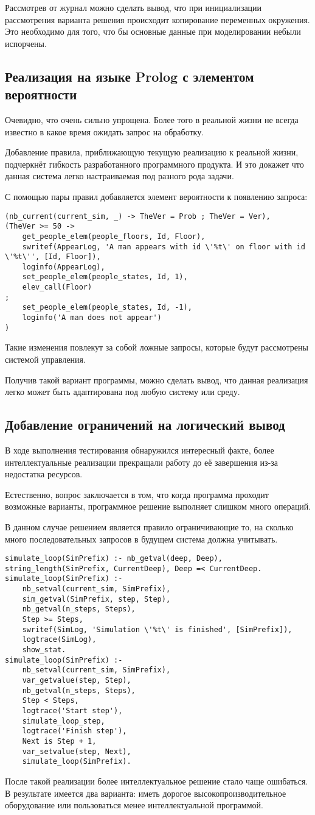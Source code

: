 		Рассмотрев от журнал можно сделать вывод, что при инициализации рассмотрения варианта решения
			происходит копирование переменных окружения. Это необходимо для того, что бы 
			основные данные при моделировании небыли испорчены.

	\subsection{Реализация на языке Prolog с элементом вероятности}
		Очевидно, что очень сильно упрощена. Более того в реальной жизни не всегда известно
			в какое время ожидать запрос на обработку.

		Добавление правила, приближающую текущую реализацию к реальной жизни, подчеркнёт
			гибкость разработанного программного продукта. И это докажет что данная система легко настраиваемая
			под разного рода задачи.

		С помощью пары правил добавляется элемент вероятности к появлению запроса:
\begin{lstlisting}
(nb_current(current_sim, _) -> TheVer = Prob ; TheVer = Ver),
(TheVer >= 50 ->
	get_people_elem(people_floors, Id, Floor),
	swritef(AppearLog, 'A man appears with id \'%t\' on floor with id \'%t\'', [Id, Floor]),
	loginfo(AppearLog),
	set_people_elem(people_states, Id, 1),
	elev_call(Floor)
;
	set_people_elem(people_states, Id, -1),
	loginfo('A man does not appear')
)
\end{lstlisting}

		Такие изменения повлекут за собой ложные запросы, которые будут рассмотрены системой управления.

		Получив такой вариант программы, можно сделать вывод, что данная реализация легко  может быть адаптирована
			под любую систему или среду.

	\subsection{Добавление ограничений на логический вывод}
		В ходе выполнения тестирования обнаружился интересный факте, более интеллектуальные реализации
			прекращали работу до её завершения из-за недостатка ресурсов. 

		Естественно, вопрос заключается в том, что когда программа проходит возможные варианты,
			программное решение выполняет слишком много операций.

		В данном случае решением является правило ограничивающие то, на сколько много последовательных запросов
			в будущем система должна учитывать.
\begin{lstlisting}
simulate_loop(SimPrefix) :- nb_getval(deep, Deep), string_length(SimPrefix, CurrentDeep), Deep =< CurrentDeep.
simulate_loop(SimPrefix) :-
	nb_setval(current_sim, SimPrefix),
	sim_getval(SimPrefix, step, Step),
	nb_getval(n_steps, Steps),
	Step >= Steps,
	swritef(SimLog, 'Simulation \'%t\' is finished', [SimPrefix]),
	logtrace(SimLog),
	show_stat.
simulate_loop(SimPrefix) :-
	nb_setval(current_sim, SimPrefix),
	var_getvalue(step, Step),
	nb_getval(n_steps, Steps),
	Step < Steps,
	logtrace('Start step'),
	simulate_loop_step,
	logtrace('Finish step'),
	Next is Step + 1,
	var_setvalue(step, Next),
	simulate_loop(SimPrefix).
\end{lstlisting}
		
		 После такой реализации более интеллектуальное решение стало чаще ошибаться. В результате имеется два варианта:
		 	иметь дорогое высокопроизводительное оборудование или пользоваться менее интеллектуальной программой.
